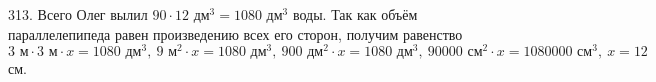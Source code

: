 313. Всего Олег вылил $90\cdot12\text{ дм}^3=1080\text{ дм}^3$ воды. Так как объём параллелепипеда равен произведению всех его сторон, получим равенство $3\text{ м}\cdot3\text{ м}\cdot x=1080\text{ дм}^3,\ 9\text{ м}^2\cdot x=1080\text { дм}^3,\ 900\text{ дм}^2\cdot x=1080\text { дм}^3,\
90000\text{ см}^2\cdot x=1080000\text { см}^3,\ x=12$см.\\
